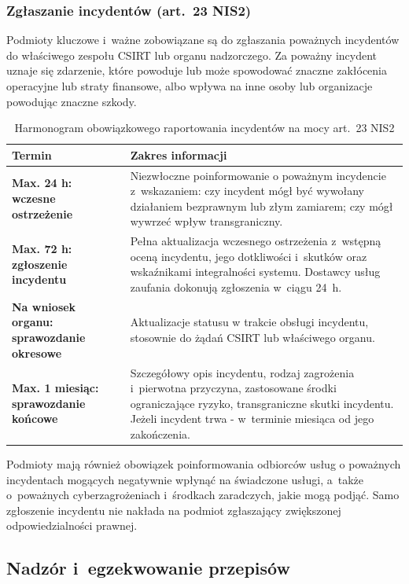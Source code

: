\subsubsection{Zgłaszanie incydentów (art.~23 NIS2)}

Podmioty kluczowe i~ważne zobowiązane są do zgłaszania {poważnych incydentów} do właściwego zespołu CSIRT lub organu nadzorczego. Za poważny
incydent uznaje się zdarzenie, które powoduje lub może spowodować znaczne zakłócenia operacyjne lub straty finansowe, albo wpływa na inne osoby lub
organizacje powodując znaczne szkody.

\begin{table}[H]
\centering
\caption{Harmonogram obowiązkowego raportowania incydentów na mocy art.~23 NIS2}
\label{tab:nis2_raportowanie}
\begin{tabular}{>{\bfseries}p{4cm} p{9.5cm}}
\hline
Termin & Zakres informacji \\
\hline
Max. 24 h:  wczesne ostrzeżenie
  & Niezwłoczne poinformowanie o poważnym incydencie z~wskazaniem: czy
    incydent mógł być wywołany działaniem bezprawnym lub złym zamiarem;
    czy mógł wywrzeć wpływ transgraniczny. \\[4pt]
Max. 72 h:  zgłoszenie incydentu
  & Pełna aktualizacja wczesnego ostrzeżenia z~wstępną oceną incydentu,
    jego dotkliwości i~skutków oraz wskaźnikami integralności systemu.
    Dostawcy usług zaufania dokonują zgłoszenia w~ciągu 24~h. \\[4pt]
Na wniosek organu: sprawozdanie okresowe
  & Aktualizacje statusu w trakcie obsługi incydentu, stosownie do żądań
    CSIRT lub właściwego organu. \\[4pt]
Max. 1 miesiąc: sprawozdanie końcowe
  & Szczegółowy opis incydentu, rodzaj zagrożenia i~pierwotna przyczyna,
    zastosowane środki ograniczające ryzyko, transgraniczne skutki incydentu.
    Jeżeli incydent trwa - w~terminie miesiąca od jego zakończenia. \\
\hline
\end{tabular}
\end{table}

Podmioty mają również obowiązek poinformowania odbiorców usług o poważnych incydentach mogących negatywnie wpłynąć na świadczone usługi, a~także
o~poważnych cyberzagrożeniach i~środkach zaradczych, jakie mogą podjąć. Samo zgłoszenie incydentu nie nakłada na podmiot zgłaszający zwiększonej
odpowiedzialności prawnej.

\subsection{Nadzór i~egzekwowanie przepisów}

